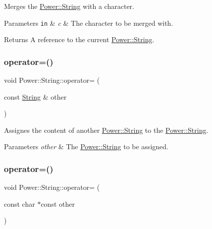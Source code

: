Merges the \hyperlink{class_power_1_1_string}{Power\+::\+String} with a character. 


\begin{DoxyParams}[1]{Parameters}
\mbox{\tt in}  & {\em c} & The character to be merged with. \\
\hline
\end{DoxyParams}
\begin{DoxyReturn}{Returns}
A reference to the current \hyperlink{class_power_1_1_string}{Power\+::\+String}. 
\end{DoxyReturn}
\mbox{\label{class_power_1_1_string_ac0ec7adf5e627919b560ce591add0644}} 
\subsubsection{\texorpdfstring{operator=()}{operator=()}\hspace{0.1cm}{\footnotesize\ttfamily [1/3]}}
{\footnotesize\ttfamily void Power\+::\+String\+::operator= (\begin{DoxyParamCaption}\item[{const \hyperlink{class_power_1_1_string}{String} \&}]{other }\end{DoxyParamCaption})\hspace{0.3cm}{\ttfamily [inline]}}



Assignes the content of another \hyperlink{class_power_1_1_string}{Power\+::\+String} to the \hyperlink{class_power_1_1_string}{Power\+::\+String}. 


\begin{DoxyParams}{Parameters}
{\em other} & The \hyperlink{class_power_1_1_string}{Power\+::\+String} to be assigned. \\
\hline
\end{DoxyParams}
\mbox{\label{class_power_1_1_string_abf5f2db360bf2c1853bccfcc8e2d3225}} 
\subsubsection{\texorpdfstring{operator=()}{operator=()}\hspace{0.1cm}{\footnotesize\ttfamily [2/3]}}
{\footnotesize\ttfamily void Power\+::\+String\+::operator= (\begin{DoxyParamCaption}\item[{const char $\ast$const}]{other }\end{DoxyParamCaption})\hspace{0.3cm}{\ttfamily [inline]}}



